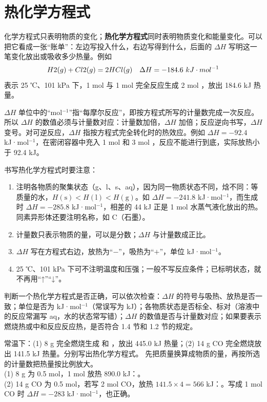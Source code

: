 \section{热化学方程式}

化学方程式只表明物质的变化；\textbf{热化学方程式}同时表明物质变化和能量变化。可以把它看成一张“账单”：左边写投入什么，右边写得到什么，后面的 $\Delta H$ 写明这一笔变化放出或吸收多少热量。例如 \[H2(g) + Cl2(g) = 2HCl(g)\quad\Delta H=-184.6\ kJ\cdot mol^{-1}\]
表示 25 ℃、101 kPa 下，1 mol  与 1 mol  完全反应生成 2 mol ，放出 184.6 kJ 热量。

$\Delta H$ 单位中的“mol$^{-1}$”指“每摩尔反应”，即按方程式所写的计量数完成一次反应。所以 $\Delta H$ 的数值必须与计量数对应：计量数加倍，$\Delta H$ 加倍；反应逆向书写，$\Delta H$ 变号。对可逆反应，$\Delta H$ 指按方程式完全转化时的热效应。例如  $\Delta H=-92.4$ kJ·mol$^{-1}$，在密闭容器中充入 1 mol  和 3 mol ，反应不能进行到底，实际放热小于 92.4 kJ。

书写热化学方程式时要注意：
\begin{enumerate}
\item 注明各物质的聚集状态（g、l、s、aq），因为同一物质状态不同，焓不同：等质量的水，$H(\mathrm{s})<H(\mathrm{l})<H(\mathrm{g})$。如  $\Delta H=-241.8$ kJ·mol$^{-1}$，而生成  时 $\Delta H=-285.8$ kJ·mol$^{-1}$，相差的 44 kJ 正是 1 mol 水蒸气液化放出的热。同素异形体还要注明名称，如 C（石墨）。
\item 计量数只表示物质的量，可以是分数；$\Delta H$ 与计量数成正比。
\item $\Delta H$ 写在方程式右边，放热为“$-$”，吸热为“$+$”，单位 kJ·mol$^{-1}$。
\item 25 ℃、101 kPa 下可不注明温度和压强；一般不写反应条件；已标明状态，就不再用“↑”“↓”。
\end{enumerate}
判断一个热化学方程式是否正确，可以依次检查：$\Delta H$ 的符号与吸热、放热是否一致；单位是否为 kJ·mol$^{-1}$（常误写为 kJ）；各物质状态是否标全、标对（溶液中的反应常漏写 aq，水的状态常写错）；$\Delta H$ 的数值是否与计量数对应；如果要表示燃烧热或中和反应反应热，是否符合 1.4 节和 1.2 节的规定。

\begin{liti}[基础]
常温下：(1) 8 g  完全燃烧生成  和 ，放出 445.0 kJ 热量；(2) 14 g CO 完全燃烧放出 141.5 kJ 热量。分别写出热化学方程式。
\tcblower
\silu 先把质量换算成物质的量，再按所选的计量数把热量按比例放大。\\
\jie (1) 8 g  为 0.5 mol，1 mol 放热 890.0 kJ：。\\
(2) 14 g CO 为 0.5 mol，若写 2 mol CO，放热 $141.5\times4=566$ kJ：。写成 1 mol CO 时 $\Delta H=-283$ kJ·mol$^{-1}$，也正确。
\end{liti}

